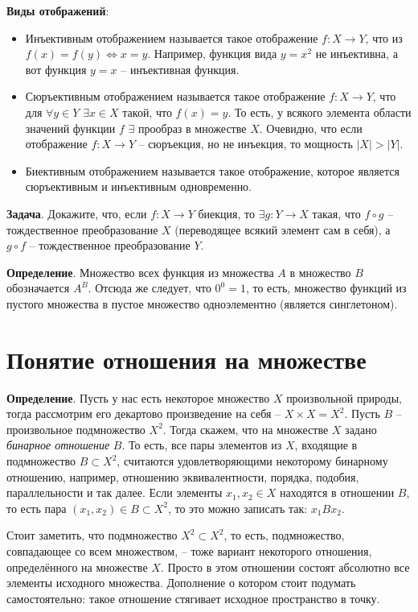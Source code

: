 \documentclass[a4paper]{book}
\begin{document}
\textbf{Виды отображений}: 
\begin{itemize}
	\item Инъективным отображением называется такое отображение $f:X\rightarrow Y$, что из $f(x) = f(y) \Leftrightarrow x=y$. Например, функция вида $y=x^2$ не инъективна, а вот функция $y=x$ -- инъективная функция. 
	\item Сюръективным отображением называется такое отображение $f:X\rightarrow Y$, что для $\forall y\in Y$ $\exists x\in X$ такой, что $f(x) = y$. То есть, у всякого элемента области значений функции $f$ $\exists$ прообраз в множестве $X$. Очевидно, что если отображение $f: X\rightarrow Y$ -- сюръекция, но не инъекция, то мощность $| X | > | Y |$.  
	\item Биективным отображением называется такое отображение, которое является сюръективным и инъективным одновременно.

\end{itemize}

\textbf{Задача}. Докажите, что, если $f: X\rightarrow Y$ биекция, то $\exists g:Y\rightarrow X$ такая, что $f \circ g$ -- тождественное преобразование $X$ (переводящее всякий элемент сам в себя), а $g \circ f$ -- тождественное преобразование $Y$.

\textbf{Определение}. Множество всех функция из множества $A$ в множество $B$ обозначается $ A^B $. Отсюда же следует, что $0^0 = 1$, то есть, множество функций из пустого множества в пустое множество одноэлементно (является синглетоном). 

\section{Понятие отношения на множестве}

\textbf{Определение}. Пусть у нас есть некоторое множество $X$ произвольной природы, тогда рассмотрим его декартово произведение на себя -- $X\times X = X^2$. Пусть $B$ -- произвольное подмножество $X^2$. Тогда скажем, что на множестве $X$ задано \textit{бинарное отношение} $B$.  То есть, все пары элементов из $X$, входящие в подмножество $B\subset X^2$, считаются удовлетворяющими некоторому бинарному отношению, например, отношению эквивалентности,  порядка, подобия, параллельности и так далее. Если элементы $x_1,x_2\in X$ находятся в отношении $B$, то есть пара $(x_1,x_2)\in B\subset X^2$, то это можно записать так: $x_1 B x_2$. 

Стоит заметить, что подмножество $X^2\subset X^2$, то есть, подмножество, совпадающее со всем множеством, -- тоже вариант некоторого отношения, определённого на множестве $X$. Просто в этом отношении состоят абсолютно все элементы исходного множества. Дополнение о котором стоит подумать самостоятельно: такое отношение стягивает исходное пространство в точку. 
\end{document}
